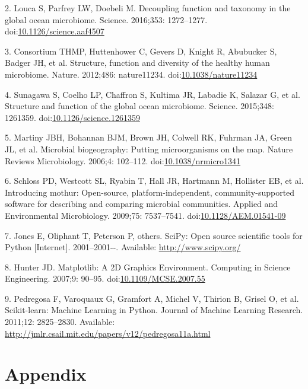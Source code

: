 \documentclass[12pt,a4paper,]{article}
\begin{document}
\hypertarget{ref-louca_decoupling_2016}{}
2. Louca S, Parfrey LW, Doebeli M. Decoupling function and taxonomy in
the global ocean microbiome. Science. 2016;353: 1272--1277.
doi:\href{https://doi.org/10.1126/science.aaf4507}{10.1126/science.aaf4507}

\hypertarget{ref-consortium_structure_2012}{}
3. Consortium THMP, Huttenhower C, Gevers D, Knight R, Abubucker S,
Badger JH, et al. Structure, function and diversity of the healthy human
microbiome. Nature. 2012;486: nature11234.
doi:\href{https://doi.org/10.1038/nature11234}{10.1038/nature11234}

\hypertarget{ref-sunagawa_structure_2015}{}
4. Sunagawa S, Coelho LP, Chaffron S, Kultima JR, Labadie K, Salazar G,
et al. Structure and function of the global ocean microbiome. Science.
2015;348: 1261359.
doi:\href{https://doi.org/10.1126/science.1261359}{10.1126/science.1261359}

\hypertarget{ref-martiny_microbial_2006}{}
5. Martiny JBH, Bohannan BJM, Brown JH, Colwell RK, Fuhrman JA, Green
JL, et al. Microbial biogeography: Putting microorganisms on the map.
Nature Reviews Microbiology. 2006;4: 102--112.
doi:\href{https://doi.org/10.1038/nrmicro1341}{10.1038/nrmicro1341}

\hypertarget{ref-schloss_introducing_2009}{}
6. Schloss PD, Westcott SL, Ryabin T, Hall JR, Hartmann M, Hollister EB,
et al. Introducing mothur: Open-source, platform-independent,
community-supported software for describing and comparing microbial
communities. Applied and Environmental Microbiology. 2009;75:
7537--7541.
doi:\href{https://doi.org/10.1128/AEM.01541-09}{10.1128/AEM.01541-09}

\hypertarget{ref-scipy}{}
7. Jones E, Oliphant T, Peterson P, others. SciPy: Open source
scientific tools for Python {[}Internet{]}. 2001--2001-\/-. Available:
\url{http://www.scipy.org/}

\hypertarget{ref-hunter_matplotlib:_2007}{}
8. Hunter JD. Matplotlib: A 2D Graphics Environment. Computing in
Science Engineering. 2007;9: 90--95.
doi:\href{https://doi.org/10.1109/MCSE.2007.55}{10.1109/MCSE.2007.55}

\hypertarget{ref-pedregosa_scikit-learn:_2011}{}
9. Pedregosa F, Varoquaux G, Gramfort A, Michel V, Thirion B, Grisel O,
et al. Scikit-learn: Machine Learning in Python. Journal of Machine
Learning Research. 2011;12: 2825--2830. Available:
\url{http://jmlr.csail.mit.edu/papers/v12/pedregosa11a.html}

\section{Appendix}\label{appendix}
\end{document}
